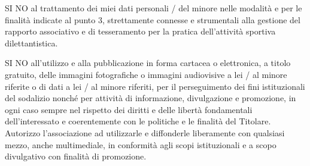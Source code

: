 \documentclass{djtsmod}
\begin{document}
	\squarelabel\; SI \quad \squarelabel\; NO \quad al trattamento dei miei dati personali / del minore nelle modalità e per le finalità indicate al punto 3, strettamente connesse e strumentali alla gestione del rapporto associativo e di tesseramento per la pratica dell’attività sportiva dilettantistica.
	
	\squarelabel\; SI \quad \squarelabel\; NO \quad all'utilizzo e alla pubblicazione in forma cartacea o elettronica, a titolo gratuito, delle immagini fotografiche o immagini audiovisive a lei / al minore riferite o di dati a lei / al minore riferiti, per il perseguimento dei fini istituzionali del sodalizio nonché per attività di informazione, divulgazione e promozione, in ogni caso sempre nel rispetto dei diritti e delle libertà fondamentali dell’interessato e coerentemente con le politiche e le finalità del Titolare. Autorizzo l’associazione ad utilizzarle e diffonderle liberamente con qualsiasi mezzo, anche multimediale, in conformità agli scopi istituzionali e a scopo divulgativo con finalità di promozione.
	
\end{document}
